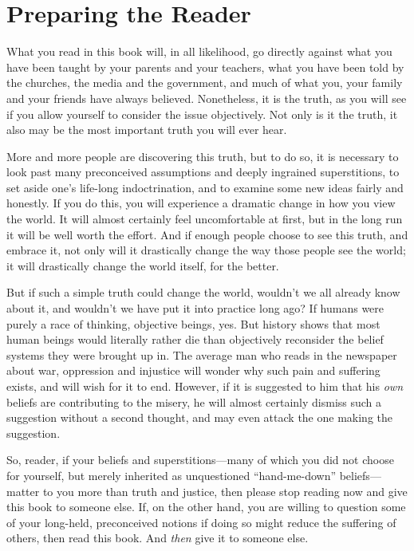 \documentclass{book}
\begin{document}
\section{Preparing the Reader}

What you read in this book will, in all likelihood, go directly against what you have been taught by your parents and your teachers, what you have been told by the churches, the media and the government, and much of what you, your family and your friends have always believed. Nonetheless, it is the truth, as you will see if you allow yourself to consider the issue objectively. Not only is it the truth, it also may be the most important truth you will ever hear.

More and more people are discovering this truth, but to do so, it is necessary to look past many preconceived assumptions and deeply ingrained superstitions, to set aside one's life-long indoctrination, and to examine some new ideas fairly and honestly. If you do this, you will experience a dramatic change in how you view the world. It will almost certainly feel uncomfortable at first, but in the long run it will be well worth the effort. And if enough people choose to see this truth, and embrace it, not only will it drastically change the way those people see the world; it will drastically change the world itself, for the better.

But if such a simple truth could change the world, wouldn't we all already know about it, and wouldn't we have put it into practice long ago? If humans were purely a race of thinking, objective beings, yes. But history shows that most human beings would literally rather die than objectively reconsider the belief systems they were brought up in. The average man who reads in the newspaper about war, oppression and injustice will wonder why such pain and suffering exists, and will wish for it to end. However, if it is suggested to him that his \emph{own} beliefs are contributing to the misery, he will almost certainly dismiss such a suggestion without a second thought, and may even attack the one making the suggestion.

So, reader, if your beliefs and superstitions---many of which you did not choose for yourself, but merely inherited as unquestioned \enquote{hand-me-down} beliefs---matter to you more than truth and justice, then please stop reading now and give this book to someone else. If, on the other hand, you are willing to question some of your long-held, preconceived notions if doing so might reduce the suffering of others, then read this book. And \emph{then} give it to someone else.
\end{document}
